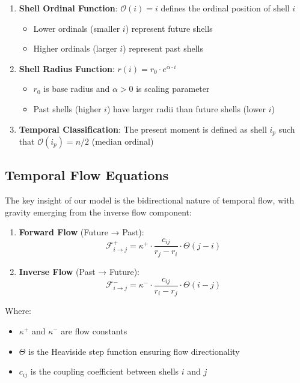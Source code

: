 \documentclass[12pt,a4paper]{article}
\begin{document}
\begin{enumerate}
    \item \textbf{Shell Ordinal Function}: $\mathcal{O}(i) = i$ defines the ordinal position of shell $i$
    \begin{itemize}
        \item Lower ordinals (smaller $i$) represent future shells
        \item Higher ordinals (larger $i$) represent past shells
    \end{itemize}
    
    \item \textbf{Shell Radius Function}: $r(i) = r_0 \cdot e^{\alpha \cdot i}$
    \begin{itemize}
        \item $r_0$ is base radius and $\alpha > 0$ is scaling parameter
        \item Past shells (higher $i$) have larger radii than future shells (lower $i$)
    \end{itemize}
    
    \item \textbf{Temporal Classification}: The present moment is defined as shell $i_p$ such that $\mathcal{O}(i_p) = n/2$ (median ordinal)
\end{enumerate}

\subsection{Temporal Flow Equations}

The key insight of our model is the bidirectional nature of temporal flow, with gravity emerging from the inverse flow component:

\begin{enumerate}
    \item \textbf{Forward Flow} (Future → Past):
    \begin{equation}
        \mathcal{F}^+_{i \to j} = \kappa^+ \cdot \frac{c_{ij}}{r_j - r_i} \cdot \Theta(j - i)
    \end{equation}
    
    \item \textbf{Inverse Flow} (Past → Future):
    \begin{equation}
        \mathcal{F}^-_{i \to j} = \kappa^- \cdot \frac{c_{ij}}{r_i - r_j} \cdot \Theta(i - j)
    \end{equation}
\end{enumerate}

Where:
\begin{itemize}
    \item $\kappa^+$ and $\kappa^-$ are flow constants
    \item $\Theta$ is the Heaviside step function ensuring flow directionality
    \item $c_{ij}$ is the coupling coefficient between shells $i$ and $j$
\end{itemize}
\end{document}
